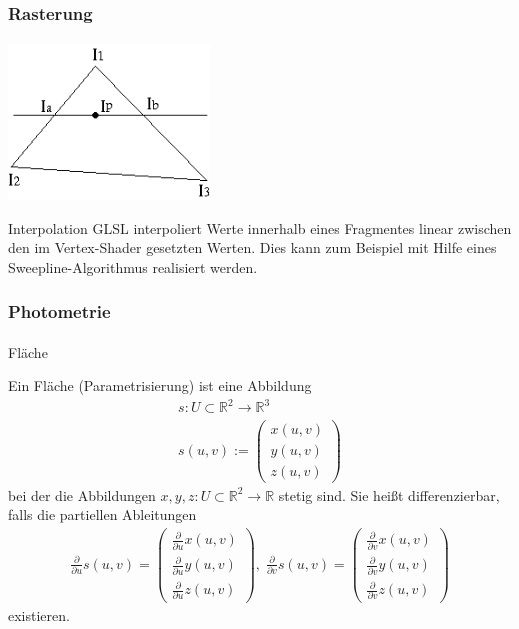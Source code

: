\documentclass{beamer}
\begin{document}
\begin{frame}
    \frametitle{Rasterung}
\framesubtitle{}
\begin{center}
    \includegraphics[width=0.4\textwidth]{images/gouraud_scanline.png}
\end{center}
\begin{block}{Interpolation}
GLSL interpoliert Werte innerhalb eines Fragmentes linear zwischen den im Vertex-Shader gesetzten Werten.
Dies kann  zum Beispiel mit Hilfe eines Sweepline-Algorithmus realisiert werden.


\end{block}
\end{frame}



\begin{frame}
    \frametitle{Photometrie}
\framesubtitle{}
\begin{block}{Fläche}

Ein Fläche (Parametrisierung) ist  eine  Abbildung
\begin{align*}
s: U \subset \mathbb{R}^2 \to \mathbb{R}^3 \\
s(u,v) := \begin{pmatrix} x(u,v) \\ y(u,v) \\ z(u,v) \end{pmatrix} 
\end{align*} 
bei der die Abbildungen $x, y, z : U \subset \mathbb{R}^2 \to \mathbb{R}$ stetig sind. Sie heißt differenzierbar, falls die partiellen Ableitungen
\begin{align*}
\frac{\partial}{\partial u} s(u,v) = \begin{pmatrix}  \frac{\partial}{\partial u} x(u,v) \\  \frac{\partial}{\partial u} y(u,v) \\  \frac{\partial}{\partial u} z(u,v) \end{pmatrix}, \;
\frac{\partial}{\partial v} s(u,v) =  \begin{pmatrix} \frac{\partial}{\partial v} x(u,v) \\ \frac{\partial}{\partial v} y(u,v) \\ \frac{\partial}{\partial v} z(u,v) \end{pmatrix}
\end{align*}
existieren. 
\end{block}
\end{frame}
\end{document}
